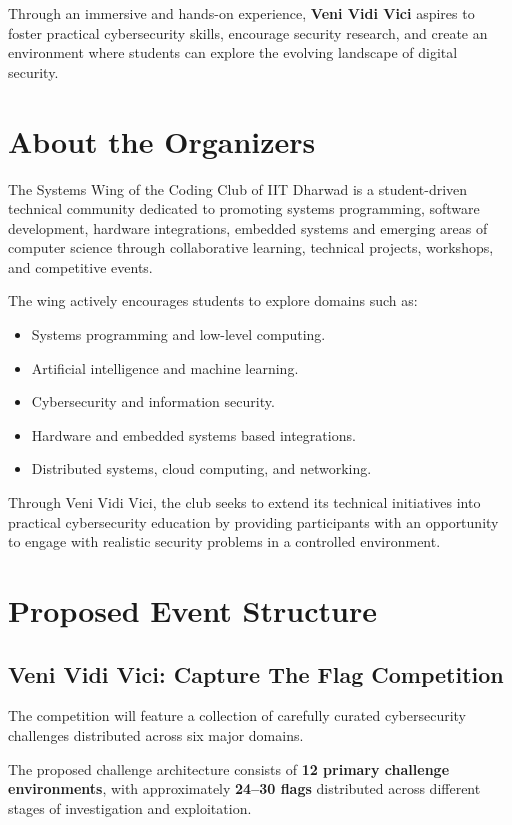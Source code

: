 \documentclass[11pt,a4paper]{article}
\begin{document}
Through an immersive and hands-on experience, \textbf{Veni Vidi Vici} aspires to foster
practical cybersecurity skills, encourage security research, and create an environment
where students can explore the evolving landscape of digital security.

\section{About the Organizers}

The Systems Wing of the Coding Club of IIT Dharwad is a student-driven technical community dedicated
to promoting systems programming, software development, hardware integrations, embedded systems
and emerging areas of computer
science through collaborative learning, technical projects, workshops, and competitive
events.

The wing actively encourages students to explore domains such as:
\begin{itemize}
    \item Systems programming and low-level computing.
    \item Artificial intelligence and machine learning.
    \item Cybersecurity and information security.
    \item Hardware and embedded systems based integrations.
    \item Distributed systems, cloud computing, and networking.
\end{itemize}

Through Veni Vidi Vici, the club seeks to extend its technical initiatives into practical
cybersecurity education by providing participants with an opportunity to engage with
realistic security problems in a controlled environment.

\section{Proposed Event Structure}

\subsection*{Veni Vidi Vici: Capture The Flag Competition}

The competition will feature a collection of carefully curated cybersecurity challenges
distributed across six major domains.

The proposed challenge architecture consists of \textbf{12 primary challenge
environments}, with approximately \textbf{24--30 flags} distributed across different
stages of investigation and exploitation.
\end{document}
